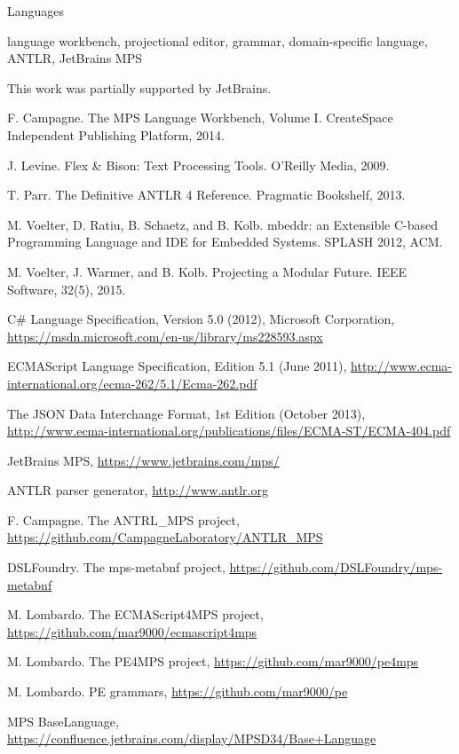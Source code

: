 \documentclass[preprint,10pt,numbers]{sigplanconf}
\begin{document}
\terms
Languages

\keywords
language workbench, projectional editor, grammar, domain-specific language, ANTLR, JetBrains MPS










\acks
This work was partially supported by JetBrains.



\begin{thebibliography}{}

 F. Campagne. The MPS Language Workbench, Volume I. CreateSpace Independent Publishing Platform, 2014.

 J. Levine. Flex \& Bison: Text Processing Tools. O'Reilly Media, 2009.

 T. Parr. The Definitive ANTLR 4 Reference. Pragmatic Bookshelf, 2013.

 M. Voelter, D. Ratiu, B. Schaetz, and B. Kolb. mbeddr: an Extensible C-based Programming Language and IDE for Embedded Systems. SPLASH 2012, ACM.

 M. Voelter, J. Warmer, and B. Kolb. Projecting a Modular Future. IEEE Software, 32(5), 2015.

 C\# Language Specification, Version 5.0 (2012), Microsoft Corporation, \url{https://msdn.microsoft.com/en-us/library/ms228593.aspx}

 ECMAScript Language Specification, Edition 5.1 (June 2011), \url{http://www.ecma-international.org/ecma-262/5.1/Ecma-262.pdf}

 The JSON Data Interchange Format, 1st Edition (October 2013), \url{http://www.ecma-international.org/publications/files/ECMA-ST/ECMA-404.pdf}

 JetBrains MPS, \url{https://www.jetbrains.com/mps/}

 ANTLR parser generator, \url{http://www.antlr.org}

 F. Campagne. The ANTRL{\_}MPS project, \url{https://github.com/CampagneLaboratory/ANTLR_MPS}

 DSLFoundry. The mps-metabnf project, \url{https://github.com/DSLFoundry/mps-metabnf}

 M. Lombardo. The ECMAScript4MPS project, \url{https://github.com/mar9000/ecmascript4mps}

 M. Lombardo. The PE4MPS project, \url{https://github.com/mar9000/pe4mps}

 M. Lombardo. PE grammars, \url{https://github.com/mar9000/pe}

 MPS BaseLanguage, \url{https://confluence.jetbrains.com/display/MPSD34/Base+Language}

\end{thebibliography}
\end{document}
